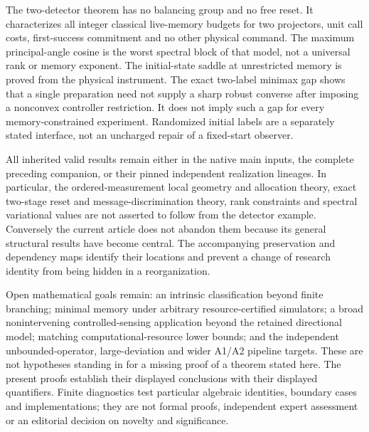 The two-detector theorem has no balancing group and no free reset. It characterizes all integer classical live-memory budgets for two projectors, unit call costs, first-success commitment and no other physical command. The maximum principal-angle cosine is the worst spectral block of that model, not a universal rank or memory exponent. The initial-state saddle at unrestricted memory is proved from the physical instrument. The exact two-label minimax gap shows that a single preparation need not supply a sharp robust converse after imposing a nonconvex controller restriction. It does not imply such a gap for every memory-constrained experiment. Randomized initial labels are a separately stated interface, not an uncharged repair of a fixed-start observer.

All inherited valid results remain either in the native main inputs, the complete preceding companion, or their pinned independent realization lineages. In particular, the ordered-measurement local geometry and allocation theory, exact two-stage reset and message-discrimination theory, rank constraints and spectral variational values are not asserted to follow from the detector example. Conversely the current article does not abandon them because its general structural results have become central. The accompanying preservation and dependency maps identify their locations and prevent a change of research identity from being hidden in a reorganization.

Open mathematical goals remain: an intrinsic classification beyond finite branching; minimal memory under arbitrary resource-certified simulators; a broad nonintervening controlled-sensing application beyond the retained directional model; matching computational-resource lower bounds; and the independent unbounded-operator, large-deviation and wider A1/A2 pipeline targets. These are not hypotheses standing in for a missing proof of a theorem stated here. The present proofs establish their displayed conclusions with their displayed quantifiers. Finite diagnostics test particular algebraic identities, boundary cases and implementations; they are not formal proofs, independent expert assessment or an editorial decision on novelty and significance.
